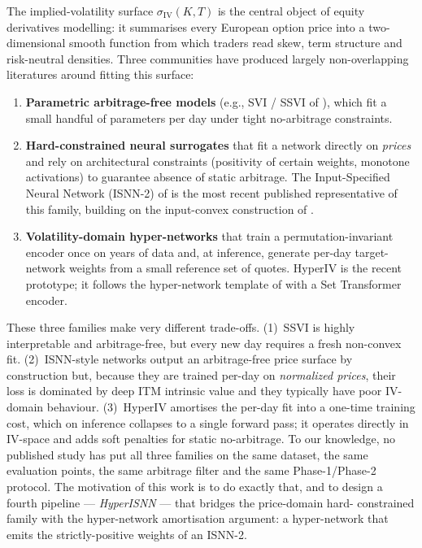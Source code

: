 \documentclass[11pt,a4paper]{article}
\newcommand{\iv}{\sigma_{\mathrm{IV}}}
\begin{document}
The implied-volatility surface $\iv(K, T)$ is the central object of equity
derivatives modelling: it summarises every European option price into a
two-dimensional smooth function from which traders read skew, term structure
and risk-neutral densities. Three communities have produced largely
non-overlapping literatures around fitting this surface:

\begin{enumerate}[leftmargin=*,itemsep=2pt,topsep=2pt]
  \item \textbf{Parametric arbitrage-free models} (e.g., SVI / SSVI of
        \citet{gatheral2004svi,gatheral2014ssvi}), which fit a small handful
        of parameters per day under tight no-arbitrage constraints.
  \item \textbf{Hard-constrained neural surrogates} that fit a network
        directly on \emph{prices} and rely on architectural constraints
        (positivity of certain weights, monotone activations) to guarantee
        absence of static arbitrage. The Input-Specified Neural Network
        (ISNN-2) of \citet{jadoon2025isnn} is the most recent published
        representative of this family, building on the input-convex
        construction of \citet{amos2017icnn}.
  \item \textbf{Volatility-domain hyper-networks} that train a
        permutation-invariant encoder once on years of data and, at
        inference, generate per-day target-network weights from a small
        reference set of quotes. HyperIV \citep{yang2025hyperiv} is the
        recent prototype; it follows the hyper-network template of
        \citet{ha2017hypernetworks} with a Set Transformer
        \citep{lee2019set} encoder.
\end{enumerate}

These three families make very different trade-offs. (1)~SSVI is highly
interpretable and arbitrage-free, but every new day requires a fresh
non-convex fit. (2)~ISNN-style networks output an arbitrage-free price
surface by construction but, because they are trained per-day on
\emph{normalized prices}, their loss is dominated by deep ITM intrinsic
value and they typically have poor IV-domain behaviour. (3)~HyperIV
amortises the per-day fit into a one-time training cost, which on inference
collapses to a single forward pass; it operates directly in IV-space and
adds soft penalties for static no-arbitrage. To our knowledge, no published
study has put all three families on the same dataset, the same evaluation
points, the same arbitrage filter and the same Phase-1/Phase-2 protocol. The
motivation of this work is to do exactly that, and to design a fourth
pipeline --- \emph{HyperISNN} --- that bridges the price-domain hard-
constrained family with the hyper-network amortisation argument: a
hyper-network that emits the strictly-positive weights of an ISNN-2.
\end{document}
